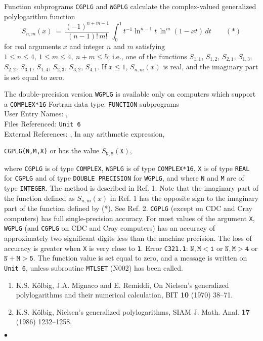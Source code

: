                   
            
\Submitter{}                       
               
Function subprograms {\tt CGPLG} and {\tt WGPLG}
calculate the complex-valued generalized polylogarithm function
$$ S_{n,m}(x) \ = \ \frac{(-1)^{n+m-1}}{(n-1)!\,m!}\,\int^1_0
t^{-1}\ln^{n-1} t \,\ln^m (1-xt)\,dt \qquad (*) $$
for real arguments $x$ and integer $n$ and $m$ satisfying
$1\leq n\leq 4,\  1\leq m\leq 4,\  n+m\leq 5$;
i.e., one of the functions
$S_{1,1}$, $ S_{1,2}$, $ S_{2,1}$, $ S_{1,3}$,
$S_{2,2}$, $ S_{3,1}$, $ S_{1,4}$, $ S_{2,3}$,
$S_{3,2}$, $ S_{4,1}$. If $x\leq1$, $S_{n,m}(x)$ is real,
and the imaginary part is set equal to zero.
\par
The double-precision version {\tt WGPLG} is available only on computers
which support a {\tt COMPLEX*16} Fortran data type.
\Structure
{\tt FUNCTION} subprograms\\
User Entry Names: , \\
Files Referenced: {\tt Unit 6} \\
External References: , 
\Usage
In any arithmetic expression,
\begin{center}
{\tt CGPLG(N,M,X)} \quad or  \quad has the value
\quad $S_{\mathtt{N,M}}(\mathtt{X})$,
\end{center}
where {\tt CGPLG} is of type {\tt COMPLEX}, {\tt WGPLG} is of type
{\tt COMPLEX*16}, {\tt X} is of type {\tt REAL}
for {\tt CGPLG} and of type {\tt DOUBLE PRECISION} for {\tt WGPLG},
and where {\tt N} and {\tt M} are of type {\tt INTEGER}.
\Method
The method is described in Ref. 1.
Note that the imaginary part of the function defined as $S_{n,m}(x)$
in Ref. 1 has the opposite sign to the
imaginary part of the function defined by (*). See Ref. 2.
\Accuracy
{\tt CGPLG} (except on CDC and Cray computers)
has full single-precision accuracy.
For most values of the argument {\tt X}, {\tt WGPLG}
(and {\tt CGPLG} on CDC and Cray computers) has an accuracy of
approximately two significant digits less than the machine precision.
The loss of accuracy is greater when {\tt X} is very close to {\tt 1}.
\Errorh
Error {\tt C321.1}: $\mathtt{N,M < 1}$ or $\mathtt{N,M > 4}$ or
$\mathtt{N+M > 5}$.
The function value is set equal to zero, and a message is written on
{\tt Unit 6}, unless subroutine {\tt MTLSET} (N002) has been called.
\Refer
\begin{enumerate}
\item K.S. K\"olbig, J.A. Mignaco and
E. Remiddi, On Nielsen's generalized polylogarithms and their
numerical calculation, BIT {\bf 10} (1970) 38--71.
\item K.S. K\"olbig, Nielsen's generalized polylogarithms,
SIAM J. Math. Anal. {\bf 17} (1986) 1232--1258.
\end{enumerate}
$\bullet$
